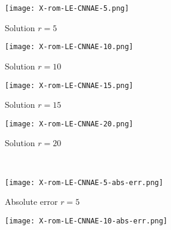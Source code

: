 \begin{figure}[!htb]
     \begin{center}
        \begin{subfigure}[b]{0.23\textwidth}
            \begin{center}
                \texttt{[image: X-rom-LE-CNNAE-5.png]}
            \end{center}
             \caption{Solution $r = 5$}
         \end{subfigure}
    \begin{subfigure}[b]{0.23\textwidth}
            \begin{center}
                \texttt{[image: X-rom-LE-CNNAE-10.png]}
            \end{center}
             \caption{Solution $r = 10$}
         \end{subfigure}
    \begin{subfigure}[b]{0.23\textwidth}
            \begin{center}
                \texttt{[image: X-rom-LE-CNNAE-15.png]}
            \end{center}
             \caption{Solution $r = 15$}
         \end{subfigure}
    \begin{subfigure}[b]{0.23\textwidth}
            \begin{center}
                \texttt{[image: X-rom-LE-CNNAE-20.png]}
            \end{center}
             \caption{Solution $r = 20$}
         \end{subfigure}\\  
         \begin{subfigure}[b]{0.23\textwidth}
             \begin{center}
                \texttt{[image: X-rom-LE-CNNAE-5-abs-err.png]}
             \end{center}
             \caption{Absolute error $r = 5$}
         \end{subfigure}  
         \begin{subfigure}[b]{0.23\textwidth}
             \begin{center}
                \texttt{[image: X-rom-LE-CNNAE-10-abs-err.png]}
             \end{center}

\end{subfigure}
\end{center}
\end{figure}
